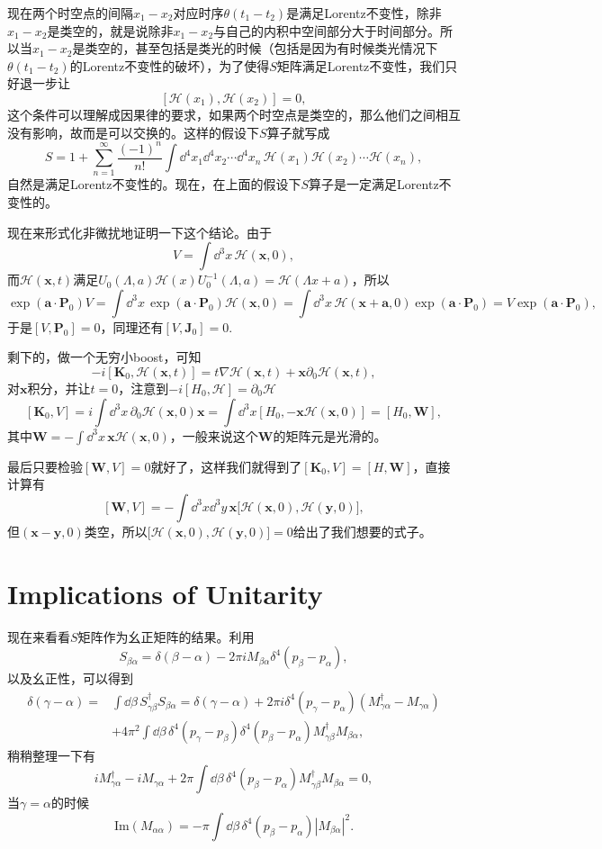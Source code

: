 \documentclass[9pt]{extbook}
\begin{document}
现在两个时空点的间隔$x_1-x_2$对应时序$\theta(t_1-t_2)$是满足Lorentz不变性，除非$x_1-x_2$是类空的，就是说除非$x_1-x_2$与自己的内积中空间部分大于时间部分。所以当$x_1-x_2$是类空的，甚至包括是类光的时候（包括是因为有时候类光情况下$\theta(t_1-t_2)$的Lorentz不变性的破坏），为了使得$S$矩阵满足Lorentz不变性，我们只好退一步让
\[
	[\mathscr{H}(x_1),\mathscr{H}(x_2)]=0,
\]
这个条件可以理解成因果律的要求，如果两个时空点是类空的，那么他们之间相互没有影响，故而是可以交换的。这样的假设下$S$算子就写成
\[
S=1+\sum_{n=1}^{\infty}\frac{(-1)^n}{n!}\int\dd^4 x_1\dd^4 x_2\cdots\dd
^4 x_n\, \mathscr{H}(x_1)\mathscr{H}(x_2)\cdots \mathscr{H}(x_n),
\]
自然是满足Lorentz不变性的。现在，在上面的假设下$S$算子是一定满足Lorentz不变性的。


现在来形式化非微扰地证明一下这个结论。由于
\[
	V=\int \dd^3 x\,\mathscr{H}(\bm{x},0),
\]
而$\mathscr{H}(\bm{x},t)$满足$U_0(\Lambda,a)\mathscr{H}(x)U_0^{-1}(\Lambda,a)=\mathscr{H}(\Lambda x+a)$，所以
\[
	\exp(\bm{a}\cdot\bm{P}_0)V=\int \dd^3 x\,\exp(\bm{a}\cdot\bm{P}_0)\mathscr{H}(\bm{x},0)=\int \dd^3 x\,\mathscr{H}(\bm{x}+\bm{a},0)\exp(\bm{a}\cdot\bm{P}_0)=V \exp(\bm{a}\cdot\bm{P}_0),
\]
于是$[V,\bm{P}_0]=0$，同理还有$[V,\bm{J}_0]=0$.

剩下的，做一个无穷小boost，可知
\[
	-i[\bm{K}_0,\mathscr{H}(\bm{x},t)]=t\nabla\mathscr{H}(\bm{x},t)+\bm{x}\partial_0\mathscr{H}(\bm{x},t),
\]
对$\bm{x}$积分，并让$t=0$，注意到$-i[H_0,\mathscr{H}]=\partial_0\mathscr{H}$
\[
	[\bm{K}_0,V]=i\int \dd^3 x\,\partial_0\mathscr{H}(\bm{x},0) \bm{x}=\int \dd^3 x[H_0,-\bm{x}\mathscr{H}(\bm{x},0)]=[H_0,\bm{W}],
\]
其中$\bm{W}=-\int \dd^3 x\,\bm{x}\mathscr{H}(\bm{x},0)$，一般来说这个$\bm{W}$的矩阵元是光滑的。

最后只要检验$[\bm{W},V]=0$就好了，这样我们就得到了$[\bm{K}_0,V]=[H,\bm{W}]$，直接计算有
\[
	[\bm{W},V]=-\int \dd^3 x\dd^3y\, \bm{x}\bigl[\mathscr{H}(\bm{x},0),\mathscr{H}(\bm{y},0)\bigr],
\]
但$(\bm{x}-\bm{y},0)$类空，所以$\bigl[\mathscr{H}(\bm{x},0),\mathscr{H}(\bm{y},0)\bigr]=0$给出了我们想要的式子。

\section{Implications of Unitarity}
现在来看看$S$矩阵作为幺正矩阵的结果。利用
\[
S_{\beta\alpha}=\delta(\beta-\alpha)-2\pi iM_{\beta\alpha}\delta^4(p_\beta-p_\alpha),
\]
以及幺正性，可以得到
\[
	\begin{split}
	\delta(\gamma-\alpha)=&\int \dd\beta \, S_{\gamma\beta}^\dag S_{\beta\alpha}=\delta(\gamma-\alpha)+2\pi i\delta^4(p_\gamma-p_\alpha)(M^\dag_{\gamma\alpha}-M_{\gamma\alpha})\\
	&+4\pi^2\int\dd\beta \,\delta^4(p_\gamma-p_\beta)\delta^4(p_\beta-p_\alpha)M_{\gamma\beta}^\dag M_{\beta\alpha},
	\end{split}
\]
稍稍整理一下有
\[
	iM^\dag_{\gamma\alpha}-iM_{\gamma\alpha}+2\pi\int\dd\beta \,\delta^4(p_\beta-p_\alpha)M_{\gamma\beta}^\dag M_{\beta\alpha}=0,
\]
当$\gamma=\alpha$的时候
\[
	\mathrm{Im}(M_{\alpha\alpha})=-\pi\int\dd\beta \,\delta^4(p_\beta-p_\alpha) |M_{\beta\alpha}|^2.
\]
\end{document}
